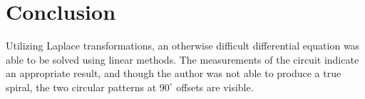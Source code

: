 \documentclass[conference]{IEEEtran}
\begin{document}
\section{Conclusion}
Utilizing Laplace transformations, an otherwise difficult differential equation was able to be solved using linear methods. The measurements of the circuit indicate an appropriate result, and though the author was not able to produce a true spiral, the two circular patterns at $90^{\circ}$ offsets are visible.
\end{document}

